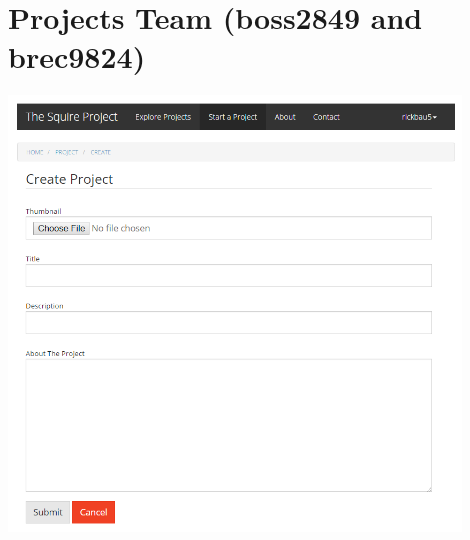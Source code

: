 \documentclass[11pt]{report}
\begin{document}
\section{Projects Team (boss2849 and brec9824)}
    \includegraphics[width=0.9\textwidth]{images/project}
\end{document}
